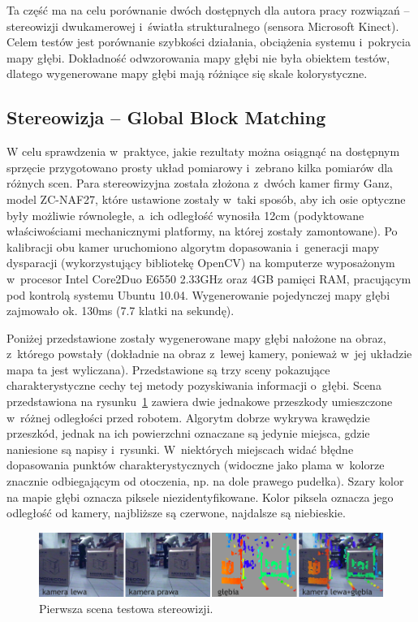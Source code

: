 Ta część ma na celu porównanie dwóch dostępnych dla autora pracy rozwiązań --
stereowizji dwukamerowej i~światła strukturalnego (sensora Microsoft Kinect).
Celem testów jest porównanie szybkości działania, obciążenia systemu i~pokrycia
mapy głębi. Dokładność odwzorowania mapy głębi nie była obiektem testów, dlatego
wygenerowane mapy głębi mają różniące się skale kolorystyczne.

\subsection{Stereowizja -- Global Block Matching}

W celu sprawdzenia w~praktyce, jakie rezultaty można osiągnąć na dostępnym sprzęcie
przygotowano prosty układ pomiarowy i~zebrano kilka pomiarów dla różnych scen.
Para stereowizyjna została złożona z~dwóch kamer firmy Ganz, model ZC-NAF27, które
ustawione zostały w~taki sposób, aby ich osie optyczne były możliwie równoległe,
a~ich odległość wynosiła 12cm (podyktowane właściwościami mechanicznymi platformy,
na której zostały zamontowane). Po kalibracji obu kamer uruchomiono algorytm
dopasowania i~generacji mapy dysparacji (wykorzystujący bibliotekę OpenCV) na
komputerze wyposażonym w~procesor Intel Core2Duo E6550 2.33GHz oraz 4GB pamięci
RAM, pracującym pod kontrolą systemu Ubuntu 10.04. Wygenerowanie pojedynczej mapy
głębi zajmowało ok. 130ms (7.7 klatki na sekundę).

Poniżej przedstawione zostały wygenerowane mapy głębi nałożone na obraz, z~którego powstały
(dokładnie na obraz z~lewej kamery, ponieważ w~jej układzie mapa ta jest wyliczana).
Przedstawione są trzy sceny pokazujące charakterystyczne cechy tej metody
pozyskiwania informacji o~głębi. Scena przedstawiona na rysunku~\ref{fig:stereo_1}
zawiera dwie jednakowe przeszkody umieszczone w~różnej odległości przed robotem.
Algorytm dobrze wykrywa krawędzie przeszkód, jednak na ich powierzchni oznaczane
są jedynie miejsca, gdzie naniesione są napisy i~rysunki. W~niektórych miejscach
widać błędne dopasowania punktów charakterystycznych (widoczne jako plama w~kolorze
znacznie odbiegającym od otoczenia, np. na dole prawego pudełka). Szary kolor na
mapie głębi oznacza piksele niezidentyfikowane. Kolor piksela oznacza jego odległość
od kamery, najbliższe są czerwone, najdalsze są niebieskie.

\begin{figure}[h!]
\centering
\includegraphics{../../Common/img/stereo_1}
\caption[Pierwsza scena testowa stereowizji]{Pierwsza scena testowa stereowizji.}
\label{fig:stereo_1}
\end{figure}

